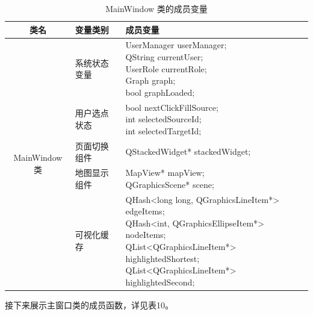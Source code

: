 \documentclass[UTF8,12pt,a4paper]{ctexart}
\begin{document}
\begin{table}[H]
\centering
\caption{MainWindow 类的成员变量}
\renewcommand{\arraystretch}{1.3}
\begin{tabular}{|
c|
>{\centering\arraybackslash}m{4cm}|
>{\centering\arraybackslash}m{9cm}|}
\hline
\textbf{类名} & \textbf{变量类别} & \textbf{成员变量} \\
\hline
\multirow{5}{*}{MainWindow 类}
& 系统状态变量
& {\centering
  UserManager userManager; \\[0.5ex]
  QString currentUser; \\[0.5ex]
  UserRole currentRole; \\[0.5ex]
  Graph graph; \\[0.5ex]
  bool graphLoaded;
}\\
\cline{2-3}

& 用户选点状态
& {\centering
  bool nextClickFillSource; \\[0.5ex]
  int selectedSourceId; \\[0.5ex]
  int selectedTargetId;
}\\
\cline{2-3}

& 页面切换组件
& {\centering
  QStackedWidget* stackedWidget;
}\\
\cline{2-3}

& 地图显示组件
& {\centering
  MapView* mapView; \\[0.5ex]
  QGraphicsScene* scene;
}\\
\cline{2-3}

& 可视化缓存
& {\centering
  QHash<long long, QGraphicsLineItem*> edgeItems; \\[0.5ex]
  QHash<int, QGraphicsEllipseItem*> nodeItems; \\[0.5ex]
  QList<QGraphicsLineItem*> highlightedShortest; \\[0.5ex]
  QList<QGraphicsLineItem*> highlightedSecond;
}\\
\hline
\end{tabular}
\end{table}

接下来展示主窗口类的成员函数，详见表10。
\end{document}
